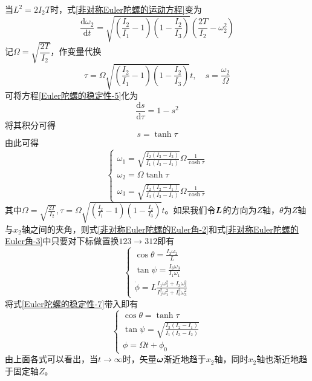 当$L^2=2I_2T$时，式\eqref{非对称Euler陀螺的运动方程}变为
\begin{equation}
	\frac{\mathrm{d}\omega_2}{\mathrm{d}t} = \sqrt{\left(\frac{I_2}{I_1}-1\right)\left(1-\frac{I_2}{I_3}\right)}\left(\frac{2T}{I_2}-\omega_2^2\right)
	\label{Euler陀螺的稳定性-5}
\end{equation}
记$\varOmega = \sqrt{\dfrac{2T}{I_2}}$，作变量代换
\begin{equation}
	\tau = \varOmega\sqrt{\left(\frac{I_2}{I_1}-1\right)\left(1-\frac{I_2}{I_3}\right)} t,\quad s = \frac{\omega_2}{\varOmega}
	\label{Euler陀螺的稳定性-6}
\end{equation}
可将方程\eqref{Euler陀螺的稳定性-5}化为
\begin{equation*}
	\frac{\mathrm{d}s}{\mathrm{d}\tau} = 1-s^2
\end{equation*}
将其积分可得
\begin{equation}
	s = \tanh \tau
\end{equation}
由此可得
\begin{equation}
\begin{cases}
	\displaystyle \omega_1 = \sqrt{\frac{I_2(I_3-I_2)}{I_1(I_3-I_1)}}\varOmega \frac{1}{\cosh \tau} \\
	\displaystyle \omega_2 = \varOmega \tanh \tau \\
	\displaystyle \omega_3 = \sqrt{\frac{I_2(I_2-I_1)}{I_3(I_3-I_1)}}\varOmega \frac{1}{\cosh \tau}
	\label{Euler陀螺的稳定性-7}
\end{cases}
\end{equation}
其中$\displaystyle \varOmega = \sqrt{\frac{2T}{I_2}},\tau = \varOmega\sqrt{\left(\frac{I_2}{I_1}-1\right)\left(1-\frac{I_2}{I_3}\right)} t$。如果我们令$\boldsymbol{L}$的方向为$Z$轴，$\theta$为$Z$轴与$x_2$轴之间的夹角，则式\eqref{非对称Euler陀螺的Euler角-2}和式\eqref{非对称Euler陀螺的Euler角-3}中只要对下标做置换$123\to 312$即有
\begin{equation}
\begin{cases}
	\displaystyle \cos\theta = \frac{I_2\omega_2}{L} \\[1.5ex]
	\displaystyle \tan\psi = \frac{I_3\omega_3}{I_1\omega_1} \\[1.5ex]
	\displaystyle \dot{\phi} = L\frac{I_1\omega_1^2+I_3\omega_3^2}{I_1^2\omega_1^2+I_3^2\omega_3^2}
\end{cases}
\label{非对称Euler陀螺自由转动特殊情形-1}
\end{equation}
将式\eqref{Euler陀螺的稳定性-7}带入即有
\begin{equation}
\begin{cases}
	\displaystyle \cos\theta = \tanh \tau \\
	\displaystyle \tan\psi = \sqrt{\frac{I_3(I_2-I_1)}{I_1(I_3-I_2)}} \\
	\displaystyle \phi = \varOmega t+\phi_0
\end{cases}
\end{equation}
由上面各式可以看出，当$t\to \infty$时，矢量$\boldsymbol{\omega}$渐近地趋于$x_2$轴，同时$x_2$轴也渐近地趋于固定轴$Z$。

